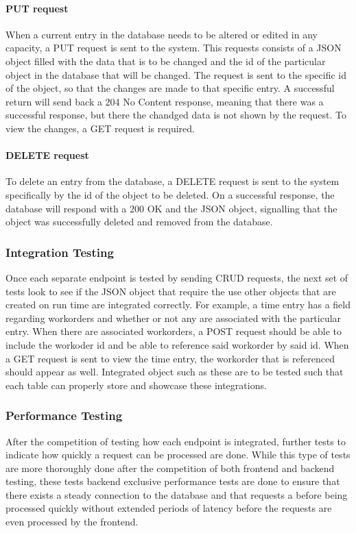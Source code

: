 {{{\paragraph{PUT request}
When a current entry in the database needs to be altered or edited in any capacity, a PUT request is sent to the system. This requests consists of a JSON object filled with the data that is to be changed and the id of the particular object in the database that will be changed. The request is sent to the specific id of the object, so that the changes are made to that specific entry. A successful return will send back a 204 No Content response, meaning that there was a successful response, but there the chandged data is not shown by the request. To view the changes, a GET request is required. 

\paragraph{DELETE request}
To delete an entry from the database, a DELETE request is sent to the system specifically by the id of the object to be deleted. On a successful response, the database will respond with a 200 OK and the JSON object, signalling that the object was successfully deleted and removed from the database. 

\subsubsection{Integration Testing}
Once each separate endpoint is tested by sending CRUD requests, the next set of tests look to see if the JSON object that require the use other objects that are created on run time are integrated correctly. For example, a time entry has a field regarding workorders and whether or not any are associated with the particular entry. When there are associated workorders, a POST request should be able to include the workoder id and be able to reference said workorder by said id. When a GET request is sent to view the time entry, the workorder that is referenced should appear as well. Integrated object such as these are to be tested such that each table can properly store and showcase these integrations. 

\subsubsection{Performance Testing}
After the competition of testing how each endpoint is integrated, further tests to indicate how quickly a request can be processed are done. While this type of tests are more thoroughly done after the competition of both frontend and backend testing, these tests backend exclusive performance tests are done to ensure that there exists a steady connection to the database and that requests a before being processed quickly without extended periods of latency before the requests are even processed by the frontend. 
\newpage

}}}

